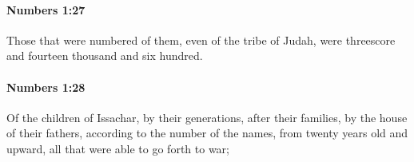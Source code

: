 		\paragraph{Numbers 1:27} %
			\label{NUMBERS-1-27}

			Those that were numbered of them, even of the tribe of Judah, were threescore and fourteen thousand and six hundred.


		\paragraph{Numbers 1:28} %
			\label{NUMBERS-1-28}

			Of the children of Issachar, by their generations, after their families, by the house of their fathers, according to the number of the names, from twenty years old and upward, all that were able to go forth to war;


